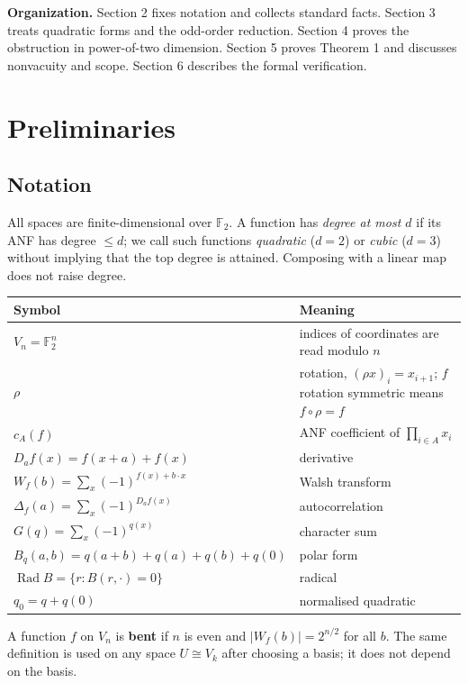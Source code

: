 \documentclass[11pt,reqno]{amsart}
\begin{document}
\textbf{Organization.} Section 2 fixes notation and collects standard facts. Section 3 treats quadratic forms and the odd-order reduction. Section 4 proves the obstruction in power-of-two dimension. Section 5 proves Theorem 1 and discusses nonvacuity and scope. Section 6 describes the formal verification.


\section{Preliminaries}

\subsection{Notation}

All spaces are finite-dimensional over $\mathbb F_2$. A function has \emph{degree at most $d$} if its ANF has degree $\le d$; we call such functions \emph{quadratic} ($d=2$) or \emph{cubic} ($d=3$) without implying that the top degree is attained. Composing with a linear map does not raise degree.

\begin{center}\small\begin{tabular}{@{}>{\raggedright\arraybackslash}p{}>{\raggedright\arraybackslash}p{}@{}}\toprule
Symbol & Meaning \\\midrule
$V_n=\mathbb F_2^n$ & indices of coordinates are read modulo $n$ \\
$\rho$ & rotation, $(\rho x)_i=x_{i+1}$; $f$ rotation symmetric means $f\circ\rho=f$ \\
$c_A(f)$ & ANF coefficient of $\prod_{i\in A}x_i$ \\
$D_af(x)=f(x+a)+f(x)$ & derivative \\
$W_f(b)=\sum_x(-1)^{f(x)+b\cdot x}$ & Walsh transform \\
$\Delta_f(a)=\sum_x(-1)^{D_af(x)}$ & autocorrelation \\
$G(q)=\sum_x(-1)^{q(x)}$ & character sum \\
$B_q(a,b)=q(a+b)+q(a)+q(b)+q(0)$ & polar form \\
$\operatorname{Rad}B=\{r: B(r,\cdot)=0\}$ & radical \\
$q_0=q+q(0)$ & normalised quadratic \\
\bottomrule\end{tabular}\end{center}

A function $f$ on $V_n$ is \textbf{bent} if $n$ is even and $|W_f(b)|=2^{n/2}$ for all $b$. The same definition is used on any space $U\cong V_k$ after choosing a basis; it does not depend on the basis.
\end{document}
